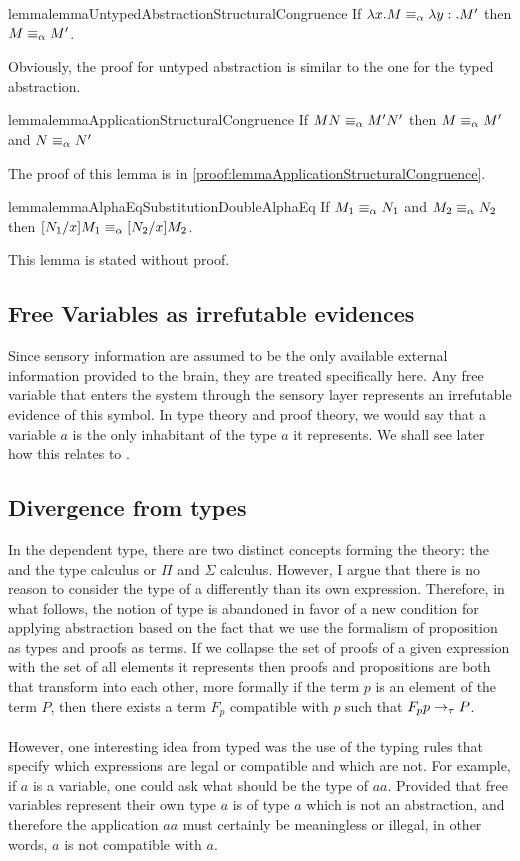 \begin{reusable}{lemma}{lemmaUntypedAbstractionStructuralCongruence}
If $\lambda x.M \equiv_\alpha \lambda y:.M'$ then $M \equiv_\alpha M'$.
\end{reusable}
Obviously, the proof for untyped abstraction is similar to the one for the typed abstraction.

\begin{reusable}{lemma}{lemmaApplicationStructuralCongruence}
If $MN \equiv_\alpha M'N'$ then $M \equiv_\alpha M'$ and $N \equiv_\alpha N'$
\end{reusable}
The proof of this lemma is in \cref{proof:lemmaApplicationStructuralCongruence}.

\begin{reusable}{lemma}{lemmaAlphaEqSubstitutionDoubleAlphaEq}
If $M_1 \equiv_\alpha N_1$ and $M_2 \equiv_\alpha N_2$ then $[N_1/x]M_1 \equiv_\alpha [N_2/x]M_2$.
\end{reusable}

This lemma is stated without proof.

\subsection{Free Variables as irrefutable evidences}

Since sensory information are assumed to be the only available external information provided to the brain, they are treated specifically here. Any free variable that enters the system through the sensory layer represents an irrefutable evidence of this symbol. In type theory and proof theory, we would say that a variable $a$ is the only inhabitant of the type $a$ it represents. We shall see later how this relates to \taureduction.

\subsection{Divergence from types}

In the dependent type, there are two distinct concepts forming the theory: the \lcalc and the type calculus or $\Pi$ and $\Sigma$ calculus. However, I argue that there is no reason to consider the type of a \lterm differently than its own expression. Therefore, in what follows, the notion of type is abandoned in favor of a new condition for applying abstraction based on the fact that we use the formalism of proposition as types and proofs as terms. If we collapse the set of proofs of a given expression with the set of all elements it represents then proofs and propositions are both \lterms that transform into each other, more formally if the term $p$ is an element of the term $P$, then there exists a term $F_{p}$ compatible with $p$ such that $F_{p}p \to_{\tau} P$.\\
\\
However, one interesting idea from typed \lcalc was the use of the typing rules that specify which expressions are legal or compatible and which are not. For example, if $a$ is a variable, one could ask what should be the type of $aa$. Provided that free variables represent their own type $a$ is of type $a$ which is not an abstraction, and therefore the application $aa$ must certainly be meaningless or illegal, in other words, $a$ is not compatible with $a$.


